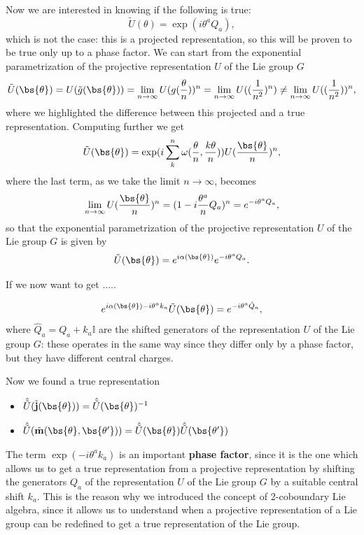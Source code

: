 Now we are interested in knowing if the following is true:
\[
    \tilde{U}(\theta) = \exp(i\theta^a Q_a),
\]
which is not the case: this is a projected representation, so this will be proven to be true only up to a phase factor. We can start from the exponential parametrization of the projective representation \(U\) of the Lie group \(G\)
\[
    \tilde{U}(\bs{\theta}) = U(\tilde{g}(\bs{\theta})) = \lim_{n \to \infty} U(g(\frac{\theta}{n}))^n = \lim_{n \to \infty} U((\frac{1}{n^2})^n) \neq \lim_{n \to \infty} U((\frac{1}{n^2}))^n,
\]
where we highlighted the difference between this projected and a true representation. Computing further we get
\[
    \tilde{U}(\bs{\theta}) = \exp(i \sum_{k}^{n} \omega(\frac{\theta}{n}, \frac{k\theta}{n})) U(\frac{\bs{\theta}}{n})^n,
\]
where the last term, as we take the limit \(n \to \infty\), becomes
\[
    \lim_{n \to \infty} U(\frac{\bs{\theta}}{n})^n = (1 - i \frac{\theta^a}{n} Q_a)^n = e^{-i \theta^a Q_a},
\]
so that the exponential parametrization of the projective representation \(U\) of the Lie group \(G\) is given by
\[
    \tilde{U}(\bs{\theta}) = e^{i \alpha(\bs{\theta})} e^{-i \theta^a Q_a}.
\]

If we now want to get .....

\[
    e^{i \alpha(\bs{\theta}) - i \theta^a k_a} \tilde{U}(\bs{\theta}) = e^{-i \theta^a \hat{Q}_a},
\]
where \(\hat{Q}_a = Q_a + k_a \mathbb{I}\) are the shifted generators of the representation \(U\) of the Lie group \(G\): these operates in the same way since they differ only by a phase factor, but they have different central charges.

Now we found a true representation
\begin{itemize}
    \item \(\hat{\tilde{U}}(\tilde{\mathbf{j}}(\bs{\theta})) = \hat{\tilde{U}}(\bs{\theta})^{-1}\)
    \item \(\hat{\tilde{U}}(\tilde{\mathbf{m}}(\bs{\theta}, \bs{\theta'})) = \hat{\tilde{U}}(\bs{\theta}) \hat{\tilde{U}}(\bs{\theta'})\)
\end{itemize}

The term \(\exp(-i \theta^a k_a)\) is an important \textbf{phase factor}, since it is the one which allows us to get a true representation from a projective representation by shifting the generators \(Q_a\) of the representation \(U\) of the Lie group \(G\) by a suitable central shift \(k_a\). This is the reason why we introduced the concept of 2-coboundary Lie algebra, since it allows us to understand when a projective representation of a Lie group can be redefined to get a true representation of the Lie group.

